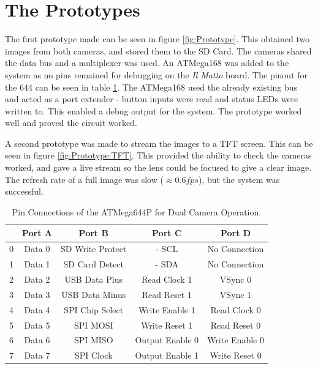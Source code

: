 \section{The Prototypes}

The first prototype made can be seen in figure \ref{fig:Prototype}. This obtained two images from both cameras, and stored them to the SD Card. The cameras shared the data bus and a \itc multiplexer was used. An ATMega168 was added to the system as no pins remained for debugging on the \textit{Il Matto} board. The pinout for the 644 can be seen in table \ref{table:644Pin}. The ATMega168 used the already existing \itc bus and acted as a port extender - button inputs were read and status LEDs were written to. This enabled a debug output for the system. The prototype worked well and proved the circuit worked. 

A second prototype was made to stream the images to a TFT screen. This can be seen in figure \ref{fig:Prototype:TFT}. This provided the ability to check the cameras worked, and gave a live stream so the lens could be focused to give a clear image. The refresh rate of a full image was slow ($\approx 0.6fps$), but the system was successful.

\begin{table}
\centering
\begin{tabular}{|c|c|c|c|c|}\hline
	& 	Port A 	& 	Port B 			& 	Port C 				& 	Port D 		\\ \hline
0	&	Data 0	&	SD Write Protect&	\itc - SCL			&	No Connection	\\
1	&	Data 1	&	SD Card Detect	&	\itc - SDA			&	No Connection	\\
2	&	Data 2	&	USB Data Plus	&	Read Clock 1		&	VSync 0			\\
3	&	Data 3	&	USB Data Minus	&	Read Reset 1		&	VSync 1			\\
4	&	Data 4	&	SPI Chip Select	&	Write Enable 1		&	Read Clock 0	\\
5	&	Data 5	&	SPI	MOSI 		&	Write Reset 1		&	Read Reset 0	\\
6	&	Data 6	&	SPI MISO		&	Output Enable 0		&	Write Enable 0	\\
7	&	Data 7	&	SPI Clock		&	Output Enable 1		&	Write Reset 0	\\
\hline

\end{tabular}
\caption{Pin Connections of the ATMega644P for Dual Camera Operation.}
\label{table:644Pin}
\end{table}

